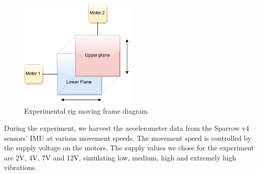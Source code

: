 \begin{figure}[ht] \centering
  \includegraphics[width=0.5\textwidth]{img/experimental-rig.png}
  \caption{Experimental rig moving frame diagram}
\end{figure}

During the experiment, we harvest the accelerometer data from the Sparrow v4 sensors' IMU at various movement speeds.
The movement speed is controlled by the supply voltage on the motors. The supply values we chose for the experiment 
are 2V, 4V, 7V and 12V, simulating low, medium, high and extremely high vibrations.
